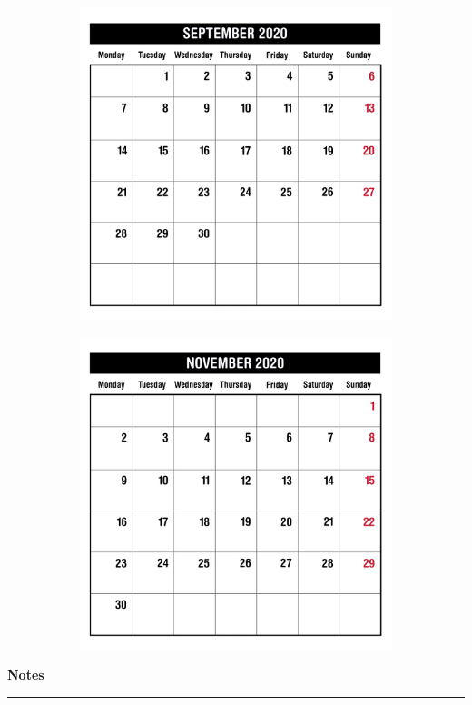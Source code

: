 \begin{figure}[H]
\begin{subfigure}[l]{0.5\textwidth}
    \includegraphics[width=\textwidth]{Sources/MonthViews/September20.jpg}
  \end{subfigure}
  \begin{subfigure}[l]{0.5\textwidth}
    \includegraphics[width=\textwidth]{Sources/MonthViews/November20.jpg}
  \end{subfigure}
\end{figure}


\newpage
\begin{notesbox}
\textbf{Notes} \\
\rule{\linewidth}{0.02cm}
\end{notesbox}